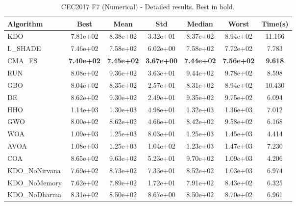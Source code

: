 \begin{table}[H]
\centering\small
\caption{CEC2017 F7 (Numerical) - Detailed results. Best in bold.}
\label{tab:cec2017_F7}
\begin{tabular}{lcccccc}
\toprule
\textbf{Algorithm} & \textbf{Best} & \textbf{Mean} & \textbf{Std} & \textbf{Median} & \textbf{Worst} & \textbf{Time(s)} \\
\midrule
KDO & 7.81e+02 & 8.38e+02 & 3.32e+01 & 8.37e+02 & 8.94e+02 & 11.166 \\
L_SHADE & 7.46e+02 & 7.58e+02 & 6.02e+00 & 7.58e+02 & 7.72e+02 & 7.783 \\
CMA_ES & \textbf{7.40e+02} & \textbf{7.45e+02} & \textbf{3.67e+00} & \textbf{7.44e+02} & \textbf{7.56e+02} & \textbf{9.618} \\
RUN & 8.08e+02 & 9.36e+02 & 3.63e+01 & 9.44e+02 & 9.78e+02 & 8.598 \\
GBO & 8.04e+02 & 8.35e+02 & 2.57e+01 & 8.31e+02 & 8.94e+02 & 10.430 \\
DE & 8.62e+02 & 9.30e+02 & 2.49e+01 & 9.35e+02 & 9.75e+02 & 6.094 \\
HHO & 1.14e+03 & 1.30e+03 & 4.98e+01 & 1.32e+03 & 1.36e+03 & 7.012 \\
GWO & 8.00e+02 & 8.62e+02 & 4.66e+01 & 8.42e+02 & 9.58e+02 & 6.168 \\
WOA & 1.09e+03 & 1.25e+03 & 8.03e+01 & 1.25e+03 & 1.45e+03 & 4.414 \\
AVOA & 1.08e+03 & 1.25e+03 & 1.04e+02 & 1.23e+03 & 1.47e+03 & 7.230 \\
COA & 8.65e+02 & 9.63e+02 & 5.23e+01 & 9.70e+02 & 1.09e+03 & 4.206 \\
KDO_NoNirvana & 7.69e+02 & 8.73e+02 & 7.33e+01 & 8.52e+02 & 1.03e+03 & 6.974 \\
KDO_NoMemory & 7.62e+02 & 7.89e+02 & 1.72e+01 & 7.91e+02 & 8.43e+02 & 6.325 \\
KDO_NoDharma & 8.31e+02 & 8.50e+02 & 8.67e+00 & 8.50e+02 & 8.70e+02 & 6.961 \\
\bottomrule
\end{tabular}
\end{table}
